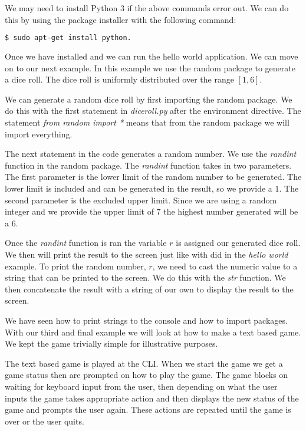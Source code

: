 We may need to install Python $3$ if the above commands error out. We can do this by using the package installer with the following command:

\begin{lstlisting}[language=bash]
    $ sudo apt-get install python.
\end{lstlisting}

Once we have  installed and we can run the hello world application. We can move on to our next example. In this example we use the random package to generate a dice roll. The dice roll is uniformly distributed over the range $[1,6]$. 

We can generate a random dice roll by first importing the random package. We do this with the first statement in \emph{diceroll.py} after the environment directive. The statement \emph{from random import *} means that from the random package we will import everything. 

The next statement in the code generates a random number. We use the \emph{randint} function in the random package. The \emph{randint} function takes in two parameters. The first parameter is the lower limit of the random number to be generated. The lower limit is included and can be generated in the result, so we provide a $1$. The second parameter is the excluded upper limit. Since we are using a random integer and we provide the upper limit of $7$ the highest number generated will be a $6$. 

Once the \emph{randint} function is ran the variable $r$ is assigned our generated dice roll. We then will print the result to the screen just like with did in the \emph{hello world} example. To print the random number, $r$, we need to cast the numeric value to a string that can be printed to the screen. We do this with the \emph{str} function. We then concatenate the result with a string of our own to display the result to the screen.
	


We have seen how to print strings to the console and how to import  packages. With our third and final  example we will look at how to make a text based game. We kept the game trivially simple for illustrative purposes. 

The text based game is played at the \ac{CLI}. When we start the game we get a game status then are prompted on how to play the game. The game blocks on waiting for keyboard input from the user, then depending on what the user inputs the game takes appropriate action and then displays the new status of the game and prompts the user again. These actions are repeated until the game is over or the user quits. 

